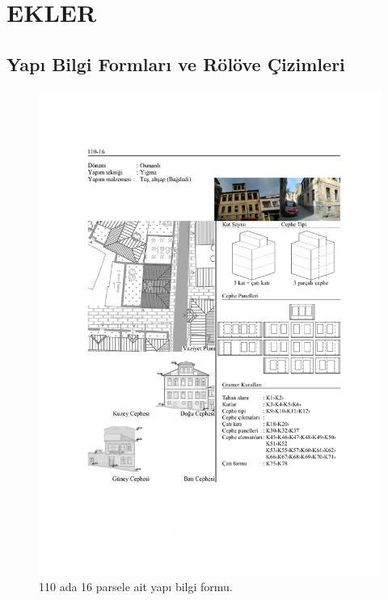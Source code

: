 \chapter{EKLER}\thispagestyle{empty}\setlength{\parindent}{10mm}\setlength{\leftskip}{0mm}\setlength{\parskip}{0pt}

\hypertarget{yapux131-bilgi-formlarux131-ve-ruxf6luxf6ve-uxe7izimleri}{%
\section{Yapı Bilgi Formları ve Rölöve
Çizimleri}\label{yapux131-bilgi-formlarux131-ve-ruxf6luxf6ve-uxe7izimleri}}

\begin{figure}
\centering
\includegraphics[width=1\textwidth,height=\textheight]{source/figures/BilgiFormlari/110-16.pdf}
\caption{110 ada 16 parsele ait yapı bilgi formu.}
\end{figure}

